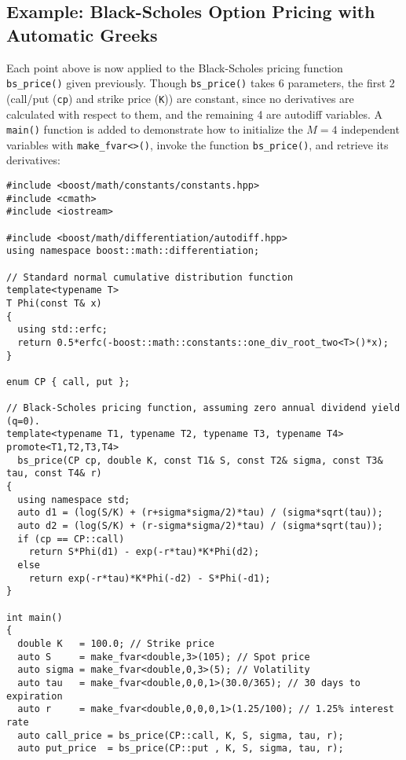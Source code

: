 \documentclass{article}
\begin{document}
\subsection{Example: Black-Scholes Option Pricing with Automatic Greeks}
Each point above is now applied to the Black-Scholes pricing function {\tt bs\_price()} given previously. Though
{\tt bs\_price()} takes 6 parameters, the first 2 (call/put ({\tt cp}) and strike price ({\tt K})) are constant,
since no derivatives are calculated with respect to them, and the remaining 4 are autodiff variables. A {\tt main()}
function is added to demonstrate how to initialize the $M=4$ independent variables with {\tt make\_fvar<>()},
invoke the function {\tt bs\_price()}, and retrieve its derivatives:

\begingroup
\fontsize{10pt}{10pt}\selectfont
\begin{verbatim}
#include <boost/math/constants/constants.hpp>
#include <cmath>
#include <iostream>

#include <boost/math/differentiation/autodiff.hpp>
using namespace boost::math::differentiation;

// Standard normal cumulative distribution function
template<typename T>
T Phi(const T& x)
{
  using std::erfc;
  return 0.5*erfc(-boost::math::constants::one_div_root_two<T>()*x);
}

enum CP { call, put };

// Black-Scholes pricing function, assuming zero annual dividend yield (q=0).
template<typename T1, typename T2, typename T3, typename T4>
promote<T1,T2,T3,T4>
  bs_price(CP cp, double K, const T1& S, const T2& sigma, const T3& tau, const T4& r)
{
  using namespace std;
  auto d1 = (log(S/K) + (r+sigma*sigma/2)*tau) / (sigma*sqrt(tau));
  auto d2 = (log(S/K) + (r-sigma*sigma/2)*tau) / (sigma*sqrt(tau));
  if (cp == CP::call)
    return S*Phi(d1) - exp(-r*tau)*K*Phi(d2);
  else
    return exp(-r*tau)*K*Phi(-d2) - S*Phi(-d1);
}

int main()
{
  double K   = 100.0; // Strike price
  auto S     = make_fvar<double,3>(105); // Spot price
  auto sigma = make_fvar<double,0,3>(5); // Volatility
  auto tau   = make_fvar<double,0,0,1>(30.0/365); // 30 days to expiration
  auto r     = make_fvar<double,0,0,0,1>(1.25/100); // 1.25% interest rate
  auto call_price = bs_price(CP::call, K, S, sigma, tau, r);
  auto put_price  = bs_price(CP::put , K, S, sigma, tau, r);


\end{verbatim}
\end{document}
